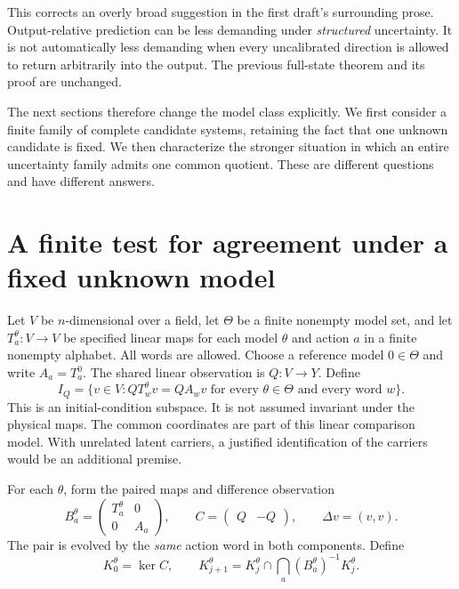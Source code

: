 \documentclass[11pt,letterpaper]{article}
\theoremstyle{plain}
\theoremstyle{definition}
\begin{document}
This corrects an overly broad suggestion in the first draft's surrounding prose. Output-relative prediction can be less demanding under \emph{structured} uncertainty. It is not automatically less demanding when every uncalibrated direction is allowed to return arbitrarily into the output. The previous full-state theorem and its proof are unchanged.

The next sections therefore change the model class explicitly. We first consider a finite family of complete candidate systems, retaining the fact that one unknown candidate is fixed. We then characterize the stronger situation in which an entire uncertainty family admits one common quotient. These are different questions and have different answers.

\section{A finite test for agreement under a fixed unknown model}\label{sec:pairtest}
Let $V$ be $n$-dimensional over a field, let $\Theta$ be a finite nonempty model set, and let $T_a^\theta:V\to V$ be specified linear maps for each model $\theta$ and action $a$ in a finite nonempty alphabet. All words are allowed. Choose a reference model $0\in\Theta$ and write $A_a=T_a^0$. The shared linear observation is $Q:V\to Y$. Define
\[
I_Q=\{v\in V:QT_w^\theta v=QA_wv\text{ for every }\theta\in\Theta\text{ and every word }w\}.
\]
This is an initial-condition subspace. It is not assumed invariant under the physical maps. The common coordinates are part of this linear comparison model. With unrelated latent carriers, a justified identification of the carriers would be an additional premise.

For each $\theta$, form the paired maps and difference observation
\[
B_a^\theta=\begin{pmatrix}T_a^\theta&0\\0&A_a\end{pmatrix},\qquad
C=\begin{pmatrix}Q&-Q\end{pmatrix},\qquad
\Delta v=(v,v).
\]
The pair is evolved by the \emph{same} action word in both components. Define
\[
K_0^\theta=\ker C,\qquad
K_{j+1}^\theta=K_j^\theta\cap\bigcap_a(B_a^\theta)^{-1}K_j^\theta.
\]
\end{document}
